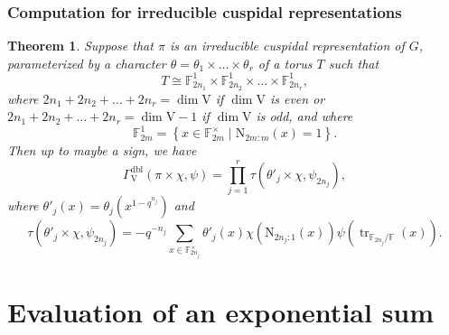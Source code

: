 \documentclass[12pt, reqno]{amsart}
\newtheorem{theorem}{Theorem}[section]
\theoremstyle{definition}
\theoremstyle{definition}
\theoremstyle{definition}
\newcommand{\multiplicativegroup}[1]{#1^{\times}}
\newcommand{\hermitianSpace}{\mathrm{V}}
\newcommand{\fieldCharacter}{\psi}
\newcommand{\trace}{\operatorname{tr}}
\newcommand{\FieldNorm}[2]{\mathrm{N}_{#1:#2}}
\newcommand{\finiteField}{\mathbb{F}}
\newcommand{\finiteFieldExtension}[1]{\finiteField_{#1}}
\newcommand{\dblGammaFactorSpace}[4]{\Gamma^{\mathrm{dbl}}_{#1}\left(#2 \times #3, #4\right)}
\begin{document}
\subsubsection{Computation for irreducible cuspidal representations}


\begin{theorem}
	Suppose that $\pi$ is an irreducible cuspidal representation of $G$, parameterized by a character $\theta = \theta_1 \times \dots \times \theta_r$ of a torus $T$ such that $$T \cong \finiteFieldExtension{2n_1}^1 \times \finiteFieldExtension{2n_2}^1 \times \dots \times \finiteFieldExtension{2n_r}^1,$$
	where $2n_1 + 2n_2 + \dots + 2n_r = \dim \hermitianSpace$ if $\dim \hermitianSpace$ is even or $2n_1 + 2n_2 + \dots + 2n_r = \dim \hermitianSpace - 1$ if $\dim \hermitianSpace$ is odd, and where $$\finiteFieldExtension{2m}^1 = \left\{ x \in \multiplicativegroup{\finiteFieldExtension{2m}} \mid \FieldNorm{2m}{m}\left(x\right)= 1\right\}.$$
	Then up to maybe a sign, we have $$\dblGammaFactorSpace{\hermitianSpace}{\pi}{\chi}{\fieldCharacter} = \prod_{j=1}^r \tau\left( \theta'_j \times \chi, \fieldCharacter_{2n_j} \right),$$
	where $\theta'_j\left(x\right) = \theta_j\left(x^{1-q^{n_j}}\right)$ and $$\tau\left( \theta'_j \times \chi, \fieldCharacter_{2n_j}\right) = -q^{-n_j} \sum_{x \in \multiplicativegroup{\finiteFieldExtension{2n_j}}} \theta'_j\left(x\right) \chi\left(\FieldNorm{2n_j}{1}\left(x\right)\right)\fieldCharacter\left(\trace_{\finiteFieldExtension{2n_j} \slash \finiteField}\left(x\right)\right).$$
\end{theorem}

\appendix
\section{Evaluation of an exponential sum}
\end{document}
